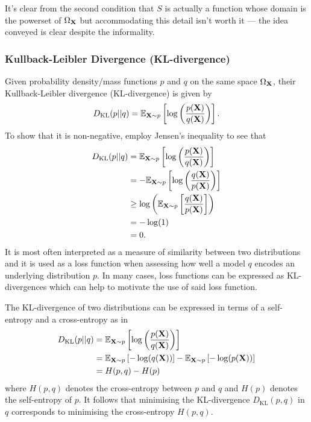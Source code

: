 \documentclass[11pt]{article}
\begin{document}
\begin{appendices}
\begin{tcolorbox}[title={\centering\textbf{Technical note regarding} $\text{dom}(S)$}, colback=myLightBlue, colbacktitle=myDarkBlue, colframe=myDarkBlue, coltitle=white]
    It's clear from the second condition that $S$ is actually a function whose domain is the powerset of $\Omega_{\mathbf{X}}$ but accommodating this detail isn't worth it — the idea conveyed is clear despite the informality.
\end{tcolorbox}

\subsubsection{Kullback-Leibler Divergence (KL-divergence)}

Given probability density/mass functions $p$ and $q$ on the same space $\Omega_{\mathbf{X}}$, their Kullback-Leibler divergence (KL-divergence) is given by
$$
D_{\text{KL}}(p||q)
=
\mathbb{E}_{\mathbf{X}\sim p}\left[\log\left(\frac{p(\mathbf{X})}{q(\mathbf{X})}\right)\right].
$$
To show that it is non-negative, employ Jensen's inequality to see that
\begin{align*}
    D_{\text{KL}}(p||q)
    &=
    \mathbb{E}_{\mathbf{X}\sim p}\left[\log\left(\frac{p(\mathbf{X})}{q(\mathbf{X})}\right)\right]\\
    &=
    -\mathbb{E}_{\mathbf{X}\sim p}\left[\log\left(\frac{q(\mathbf{X})}{p(\mathbf{X})}\right)\right]\\
    &\geq
    \log\left(\mathbb{E}_{\mathbf{X}\sim p}\left[\frac{q(\mathbf{X})}{p(\mathbf{X})}\right]\right)\\
    &=
    -\log(1)\\
    &=0.
\end{align*}
It is most often interpreted as a measure of similarity between two distributions and it is used as a loss function when assessing how well a model $q$ encodes an underlying distribution $p$. In many cases, loss functions can be expressed as KL-divergences which can help to motivate the use of said loss function.

The KL-divergence of two distributions can be expressed in terms of a self-entropy and a cross-entropy as in
\begin{align*}
    D_{\text{KL}}(p||q)
    &=
    \mathbb{E}_{\mathbf{X}\sim p}\left[\log\left(\frac{p(\mathbf{X})}{q(\mathbf{X})}\right)\right]\\
    &=
    \mathbb{E}_{\mathbf{X}\sim p}\left[-\log(q(\mathbf{X}))\right]-\mathbb{E}_{\mathbf{X}\sim p}\left[-\log(p(\mathbf{X}))\right]\\
    &=
    H(p,q)-H(p)
\end{align*}
where $H(p,q)$ denotes the cross-entropy between $p$ and $q$ and $H(p)$ denotes the self-entropy of $p$. It follows that minimising the KL-divergence $D_{\text{KL}}(p,q)$ in $q$ corresponds to minimising the cross-entropy $H(p,q)$.


\end{appendices}
\end{document}
